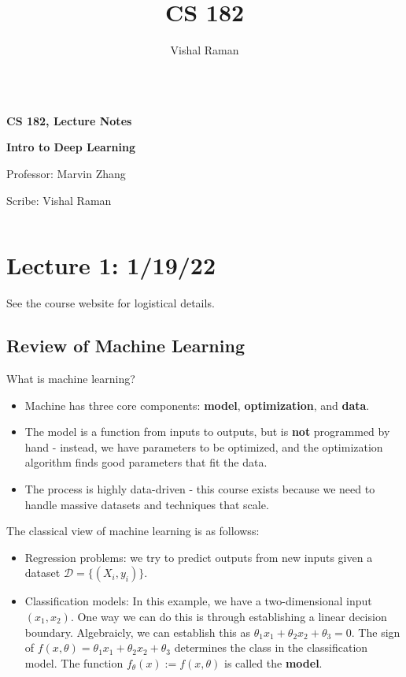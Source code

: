 \documentclass[11pt]{scrartcl}
\let \mc \mathcal
\newcommand{\1}{\textbf{1}} %
\begin{document}
\title{CS 182}
\author{Vishal Raman}
\thispagestyle{empty}
$ $
\vfill
\begin{center}

\centerline{\huge \textbf{CS 182, Lecture Notes}}
\centerline{\Large \textbf{Intro to Deep Learning} } 
\centerline{Professor: Marvin Zhang}
\centerline{Scribe: Vishal Raman}
\end{center}
\vfill
$ $
\newpage
\thispagestyle{empty}
\tableofcontents
\newpage
\section{Lecture 1: 1/19/22}
See the course website for logistical details.
\subsection{Review of Machine Learning}
What is machine learning?
\begin{itemize}
\item Machine has three core components: \textbf{model}, \textbf{optimization}, and \textbf{data}.
\item The model is a function from inputs to outputs, but is \textbf{not} programmed by hand - instead, we have parameters to be optimized, and the optimization algorithm finds good parameters that fit the data.
\item The process is highly data-driven - this course exists because we need to handle massive datasets and techniques that scale.
\end{itemize}

The classical view of machine learning is as followss:
\begin{itemize}
\item Regression problems: we try to predict outputs from new inputs given a dataset $\mc D = \{(X_i, y_i)\}$. 
\item Classification models: In this example, we have a two-dimensional input $(x_1, x_2)$.  One way we can do this is through establishing a linear decision boundary.  Algebraicly, we can establish this as $\theta_1 x_1 + \theta_2 x_2 + \theta_3 = 0$.  The sign of $f(x, \theta) = \theta_1x_1 + \theta_2x_2 + \theta_3$ determines the class in the classification model.   The function $f_\theta(x) := f(x, \theta)$ is called the \textbf{model}.
\end{itemize}
\end{document}
